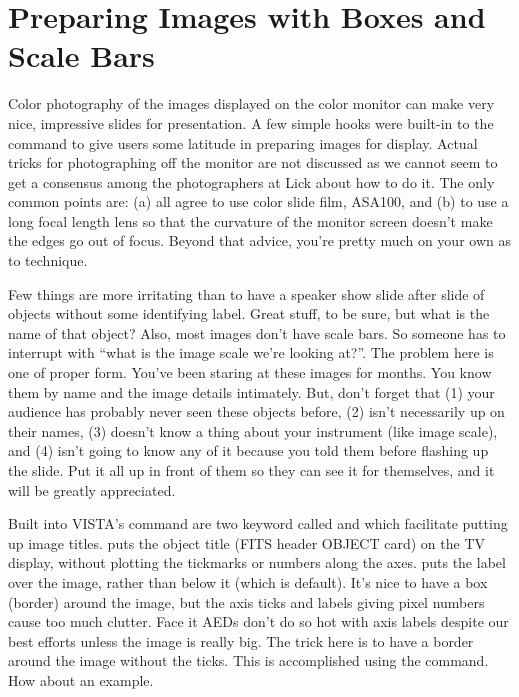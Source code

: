 
\section{Preparing Images with Boxes and Scale Bars}

Color photography of the images displayed on the color monitor can make very
nice, impressive slides for presentation.  A few simple hooks were built-in to
the  command to give users some latitude in preparing images for
display.  Actual tricks for photographing off the monitor are not discussed as
we cannot seem to get a consensus among the photographers at Lick about how to
do it.  The only common points are: (a) all agree to use color slide film,
ASA100, and (b) to use a long focal length lens so that the curvature of the
monitor screen doesn't make the edges go out of focus.  Beyond that advice,
you're pretty much on your own as to technique.

Few things are more irritating than to have a speaker show slide after slide
of objects without some identifying label.  Great stuff, to be sure, but what
is the name of that object?  Also, most images don't have scale bars. So
someone has to interrupt with ``what is the image scale we're looking at?''.
The problem here is one of proper form.  You've been staring at these images
for months.  You know them by name and the image details intimately. But,
don't forget that (1) your audience has probably never seen these objects
before, (2) isn't necessarily up on their names, (3) doesn't know a thing
about your instrument (like image scale), and (4) isn't going to know any of
it because you told them before flashing up the slide.  Put it all up in front
of them so they can see it for themselves, and it will be greatly appreciated.

Built into VISTA's  command are two keyword called  and
 which facilitate putting up image titles.   puts the
object title (FITS header OBJECT card) on the TV display, without plotting the
tickmarks or numbers along the axes.  puts the label over the image,
rather than below it (which is default).  It's nice to have a box (border)
around the image, but the axis ticks and labels giving pixel numbers cause too
much clutter.  Face it AEDs don't do so hot with axis labels despite our best
efforts unless the image is really big. The trick here is to have a border
around the image without the ticks.  This is accomplished using the
 command.  How about an example.

